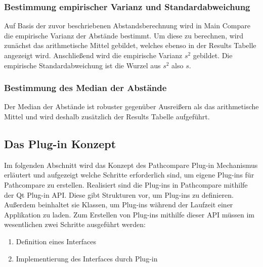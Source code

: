 
\subsubsection{Bestimmung empirischer Varianz und Standardabweichung}
Auf Basis der zuvor beschriebenen Abstandsberechnung wird in Main Compare die
empirische Varianz der Abstände bestimmt. Um diese zu berechnen, wird zunächst
das arithmetische Mittel gebildet, welches ebenso in der Results Tabelle angezeigt wird.
Anschließend wird die empirische Varianz $s^2$ gebildet. Die empirische Standardabweichung
ist die Wurzel aus $s^2$ also $s$.

\subsubsection{Bestimmung des Median der Abstände}
Der Median der Abstände ist robuster gegenüber Ausreißern als das
arithmetische Mittel und wird deshalb zusätzlich der Results Tabelle
aufgeführt.

\subsection{Das Plug-in Konzept}

Im folgenden Abschnitt wird das Konzept des Pathcompare Plug-in Mechanismus
erläutert und aufgezeigt welche Schritte erforderlich sind, um eigene Plug-ins
für Pathcompare zu erstellen. Realisiert sind die Plug-ins in Pathcompare
mithilfe der Qt Plug-in API. Diese gibt Strukturen vor, um Plug-ins zu
definieren. Außerdem beinhaltet sie Klassen, um Plug-ins während der Laufzeit
einer Applikation zu laden.  Zum Erstellen von Plug-ins mithilfe dieser API
müssen im wesentlichen zwei Schritte ausgeführt werden:

\begin{enumerate}
  \item Definition eines Interfaces
  \item Implementierung des Interfaces durch Plug-in
\end{enumerate}

